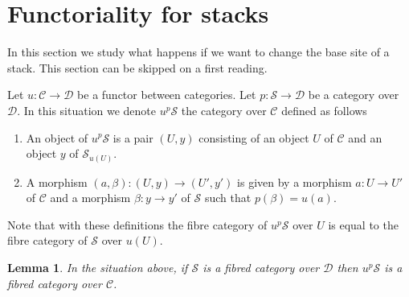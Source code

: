 \documentclass{stacks-project}
\theoremstyle{plain}
\newtheorem{lemma}[subsection]{Lemma}
\theoremstyle{definition}
\theoremstyle{remark}
\numberwithin{equation}{subsection}
\begin{document}
\section{Functoriality for stacks}
\label{section-inverse-image}

\noindent
In this section we study what happens if we want to change the base site
of a stack. This section can be skipped on a first reading.

\medskip\noindent
Let $u : \mathcal{C} \to \mathcal{D}$ be a functor between categories.
Let $p : \mathcal{S} \to \mathcal{D}$ be a category over $\mathcal{D}$.
In this situation we denote $u^p\mathcal{S}$ the category over $\mathcal{C}$
defined as follows
\begin{enumerate}
\item An object of $u^p\mathcal{S}$ is a pair $(U, y)$ consisting
of an object $U$ of $\mathcal{C}$ and an object $y$ of $\mathcal{S}_{u(U)}$.
\item A morphism $(a, \beta) : (U, y) \to (U', y')$ is given by
a morphism $a : U \to U'$ of $\mathcal{C}$ and a morphism $\beta : y \to y'$
of $\mathcal{S}$ such that $p(\beta) = u(a)$.
\end{enumerate}
Note that with these definitions the fibre category of
$u^p\mathcal{S}$ over $U$ is equal to the fibre category of
$\mathcal{S}$ over $u(U)$.

\begin{lemma}
\label{lemma-fibred-category-pushforward}
In the situation above, if $\mathcal{S}$ is a fibred category over
$\mathcal{D}$ then $u^p\mathcal{S}$ is a fibred category over $\mathcal{C}$.
\end{lemma}
\end{document}
